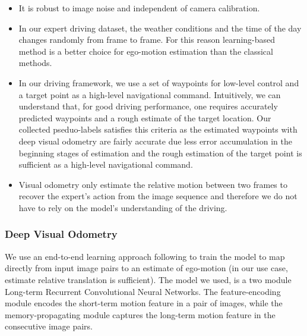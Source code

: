 \documentclass[letterpaper, 12pt]{book}
\theoremstyle{definition}
\theoremstyle{definition}
\theoremstyle{definition}
\theoremstyle{definition}
\theoremstyle{definition}
\begin{document}
\begin{itemize}
\item It is robust to image noise and independent of camera calibration.
\item In our expert driving dataset, the weather conditions and the time of the day
changes randomly from frame to frame. For this reason learning-based method is
a better choice for ego-motion estimation than the classical methods.
\item In our driving framework, we use a set of waypoints for low-level control and
a target point as a high-level navigational command. Intuitively, we can
understand that, for good driving performance, one requires accurately
predicted waypoints and a rough estimate of the target location. Our collected
pseduo-labels satisfies this criteria as the estimated waypoints with deep
visual odometry are fairly accurate due less error accumulation in the
beginning stages of estimation and the rough estimation of the target point is
sufficient as a high-level navigational command.
\item Visual odometry only estimate the relative motion between two frames to
recover the expert's action from the image sequence and therefore we do not
have to rely on the model's understanding of the driving.
\end{itemize}

\subsubsection{Deep Visual Odometry}
\label{sec:orga952f66}
We use an end-to-end learning approach following \cite{Wang2017, Zhai2019} to
train the model to map directly from input image pairs to an estimate of
ego-motion (in our use case, estimate relative translation is sufficient). The
model we used, is a two module Long-term Recurrent Convolutional Neural
Networks. The feature-encoding module encodes the short-term motion feature in a
pair of images, while the memory-propagating module captures the long-term
motion feature in the consecutive image pairs.
\end{document}
